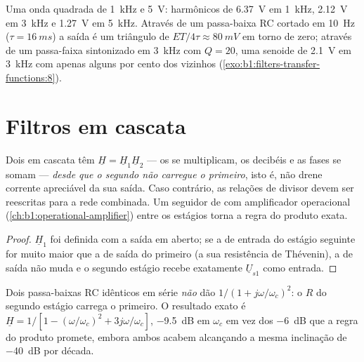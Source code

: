 \begin{example}[Números]\label{ex:b1:filters-transfer-functions:numbers}
Uma onda quadrada de \qty{1}{kHz} e  \qty{5}{V}: harmônicos de
\qty{6.37}{V} em \qty{1}{kHz}, \qty{2.12}{V} em \qty{3}{kHz} e
\qty{1.27}{V} em \qty{5}{kHz}. Através de um passa-baixa RC cortado em
\qty{10}{Hz} ($\tau = \qty{16}{ms}$) a saída é um triângulo de
 $ET/4\tau \approx \qty{80}{mV}$ em torno de zero; através de um
passa-faixa sintonizado em \qty{3}{kHz} com $Q = 20$, uma senoide de \qty{2.1}{V}
em \qty{3}{kHz} com apenas alguns por cento dos vizinhos
(\cref{exo:b1:filters-transfer-functions:8}).
\end{example}

\section{Filtros em cascata}

\begin{proposition}\label{prop:b1:filters-transfer-functions:cascade}
Dois  em cascata têm $\underline H = \underline H_1\underline H_2$
--- os  se multiplicam, os decibéis e as fases se somam --- \emph{desde que o segundo
não carregue o primeiro}, isto é, não drene corrente apreciável da sua
saída. Caso contrário, as relações de divisor devem ser reescritas para a
rede combinada. Um seguidor de  com amplificador operacional
(\cref{ch:b1:operational-amplifier}) entre os estágios torna a regra do produto
exata.
\end{proposition}

\begin{proof}
$\underline H_1$ foi definida com a saída em aberto; se a  de
entrada do estágio seguinte for muito maior que a  de saída do primeiro
(a sua resistência de Thévenin), a  de saída não muda e o
segundo estágio recebe exatamente $\underline U_{s1}$ como entrada.
\end{proof}

\begin{example}\label{ex:b1:filters-transfer-functions:tworc}
Dois passa-baixas RC idênticos em série \emph{não} dão
$1/(1 + j\omega/\omega_c)^2$: o $R$ do segundo estágio carrega o primeiro.
O resultado exato é $\underline H = 1/[1 - (\omega/\omega_c)^2 +
3j\omega/\omega_c]$, \qty{-9.5}{dB} em $\omega_c$ em vez dos
\qty{-6}{dB} que a regra do produto promete, embora ambos acabem alcançando a mesma
inclinação de \qty{-40}{dB} por década.
\end{example}

